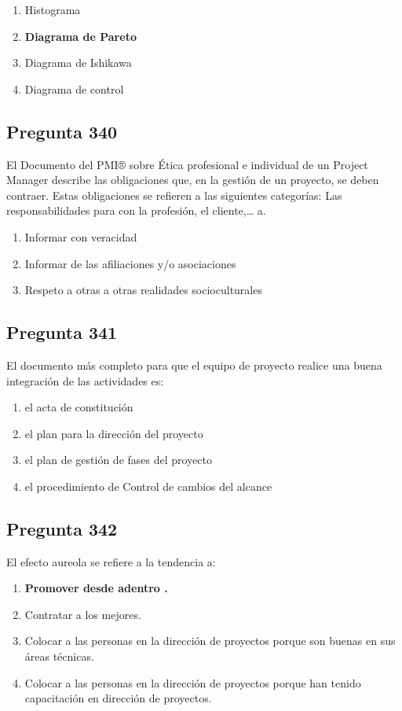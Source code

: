 \documentclass[11pt,a4paper]{article}
\begin{document}
\begin{enumerate}[label=\alph*)]
  \item Histograma
  \item \textbf{Diagrama de Pareto}
  \item Diagrama de Ishikawa
  \item Diagrama de control
\end{enumerate}

\subsection*{Pregunta 340}
El Documento del PMI® sobre Ética profesional e individual de un Project Manager describe las obligaciones que, en la gestión de un proyecto, se deben contraer. Estas obligaciones se refieren a las siguientes categorías: Las responsabilidades para con la profesión, el cliente,… a.

\begin{enumerate}[label=\alph*)]
  \item Informar con veracidad
  \item Informar de las afiliaciones y/o asociaciones
  \item Respeto a otras a otras realidades socioculturales
\end{enumerate}

\subsection*{Pregunta 341}
El documento más completo para que el equipo de proyecto realice una buena integración de las actividades es:

\begin{enumerate}[label=\alph*)]
  \item el acta de constitución
  \item el plan para la dirección del proyecto
  \item el plan de gestión de fases del proyecto
  \item el procedimiento de Control de cambios del alcance
\end{enumerate}

\subsection*{Pregunta 342}
El efecto aureola se refiere a la tendencia a:

\begin{enumerate}[label=\alph*)]
  \item \textbf{Promover desde adentro .}
  \item Contratar a los mejores.
  \item Colocar a las personas en la dirección de proyectos porque son buenas en sus áreas técnicas.
  \item Colocar a las personas en la dirección de proyectos porque han tenido capacitación en dirección de proyectos.
\end{enumerate}
\end{document}
